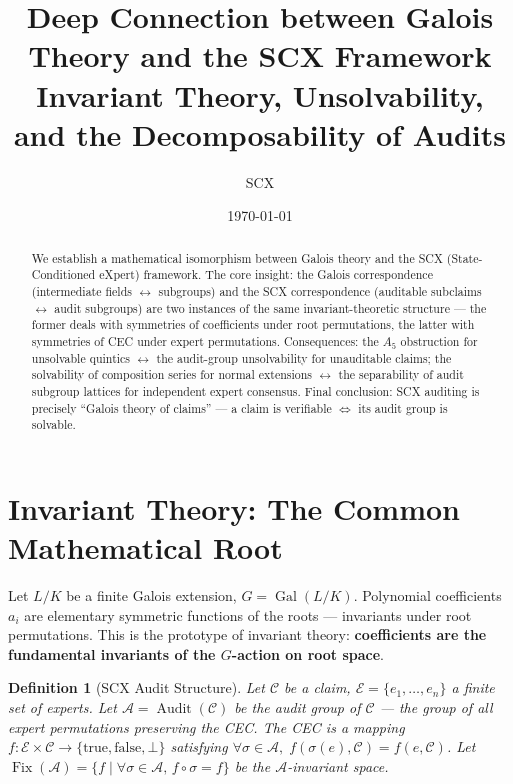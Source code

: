 \documentclass[10pt,a4paper]{article}
\title{\bfseries Deep Connection between Galois Theory and the SCX Framework\\[1pt]
\normalsize Invariant Theory, Unsolvability, and the Decomposability of Audits}
\author{SCX}
\date{\today}
\newtheorem{definition}[theorem]{Definition}
\theoremstyle{remark}
\DeclareMathOperator{\Gal}{Gal}
\DeclareMathOperator{\Audit}{Audit}
\DeclareMathOperator{\Fix}{Fix}
\newcommand{\A}{\mathcal{A}}
\newcommand{\E}{\mathcal{E}}
\newcommand{\cC}{\mathcal{C}}
\begin{document}
\maketitle
\vspace{-8pt}

\begin{abstract}
\small We establish a mathematical isomorphism between Galois theory and the SCX (State-Conditioned eXpert) framework. The core insight: the Galois correspondence (intermediate fields $\leftrightarrow$ subgroups) and the SCX correspondence (auditable subclaims $\leftrightarrow$ audit subgroups) are two instances of the same invariant-theoretic structure --- the former deals with symmetries of coefficients under root permutations, the latter with symmetries of CEC under expert permutations. Consequences: the $A_5$ obstruction for unsolvable quintics $\leftrightarrow$ the audit-group unsolvability for unauditable claims; the solvability of composition series for normal extensions $\leftrightarrow$ the separability of audit subgroup lattices for independent expert consensus. Final conclusion: SCX auditing is precisely ``Galois theory of claims'' --- a claim is verifiable $\iff$ its audit group is solvable.
\end{abstract}
\vspace{-4pt}

\section{Invariant Theory: The Common Mathematical Root}

Let $L/K$ be a finite Galois extension, $G = \Gal(L/K)$. Polynomial coefficients $a_i$ are elementary symmetric functions of the roots --- invariants under root permutations. This is the prototype of invariant theory: \textbf{coefficients are the fundamental invariants of the $G$-action on root space}.

\begin{definition}[SCX Audit Structure]
Let $\cC$ be a claim, $\E=\{e_1,\ldots,e_n\}$ a finite set of experts. Let $\A=\Audit(\cC)$ be the audit group of $\cC$ --- the group of all expert permutations preserving the CEC. The CEC is a mapping $f: \E \times \cC \to \{\text{true},\text{false},\bot\}$ satisfying $\forall\sigma\in\A,\; f(\sigma(e),\cC)=f(e,\cC)$. Let $\Fix(\A)=\{f\mid\forall\sigma\in\A,\,f\circ\sigma=f\}$ be the $\A$-invariant space.
\end{definition}
\end{document}
